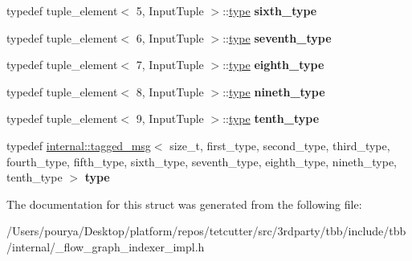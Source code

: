 \begin{DoxyCompactItemize}
\item 
\hypertarget{structinternal_1_1input__types_3_0110_00_01InputTuple_01_4_a5ce372100d089c54d906037d984d7bed}{}typedef tuple\+\_\+element$<$ 5, Input\+Tuple $>$\+::\hyperlink{classinternal_1_1tagged__msg}{type} {\bfseries sixth\+\_\+type}\label{structinternal_1_1input__types_3_0110_00_01InputTuple_01_4_a5ce372100d089c54d906037d984d7bed}

\item 
\hypertarget{structinternal_1_1input__types_3_0110_00_01InputTuple_01_4_a7d79ecf975f9df71149d24f44eaa1439}{}typedef tuple\+\_\+element$<$ 6, Input\+Tuple $>$\+::\hyperlink{classinternal_1_1tagged__msg}{type} {\bfseries seventh\+\_\+type}\label{structinternal_1_1input__types_3_0110_00_01InputTuple_01_4_a7d79ecf975f9df71149d24f44eaa1439}

\item 
\hypertarget{structinternal_1_1input__types_3_0110_00_01InputTuple_01_4_acf7fa54475fadb44fb31b817e517a692}{}typedef tuple\+\_\+element$<$ 7, Input\+Tuple $>$\+::\hyperlink{classinternal_1_1tagged__msg}{type} {\bfseries eighth\+\_\+type}\label{structinternal_1_1input__types_3_0110_00_01InputTuple_01_4_acf7fa54475fadb44fb31b817e517a692}

\item 
\hypertarget{structinternal_1_1input__types_3_0110_00_01InputTuple_01_4_a94863c70fb697e962fc5b79ad8af7d3c}{}typedef tuple\+\_\+element$<$ 8, Input\+Tuple $>$\+::\hyperlink{classinternal_1_1tagged__msg}{type} {\bfseries nineth\+\_\+type}\label{structinternal_1_1input__types_3_0110_00_01InputTuple_01_4_a94863c70fb697e962fc5b79ad8af7d3c}

\item 
\hypertarget{structinternal_1_1input__types_3_0110_00_01InputTuple_01_4_a601f2282b8596969dbd0f01e935824b9}{}typedef tuple\+\_\+element$<$ 9, Input\+Tuple $>$\+::\hyperlink{classinternal_1_1tagged__msg}{type} {\bfseries tenth\+\_\+type}\label{structinternal_1_1input__types_3_0110_00_01InputTuple_01_4_a601f2282b8596969dbd0f01e935824b9}

\item 
\hypertarget{structinternal_1_1input__types_3_0110_00_01InputTuple_01_4_a4af125c2887e5113a039bd573452971a}{}typedef \hyperlink{classinternal_1_1tagged__msg}{internal\+::tagged\+\_\+msg}$<$ size\+\_\+t, first\+\_\+type, second\+\_\+type, third\+\_\+type, fourth\+\_\+type, fifth\+\_\+type, sixth\+\_\+type, seventh\+\_\+type, eighth\+\_\+type, nineth\+\_\+type, tenth\+\_\+type $>$ {\bfseries type}\label{structinternal_1_1input__types_3_0110_00_01InputTuple_01_4_a4af125c2887e5113a039bd573452971a}

\end{DoxyCompactItemize}


The documentation for this struct was generated from the following file\+:\begin{DoxyCompactItemize}
\item 
/\+Users/pourya/\+Desktop/platform/repos/tetcutter/src/3rdparty/tbb/include/tbb/internal/\+\_\+flow\+\_\+graph\+\_\+indexer\+\_\+impl.\+h\end{DoxyCompactItemize}
